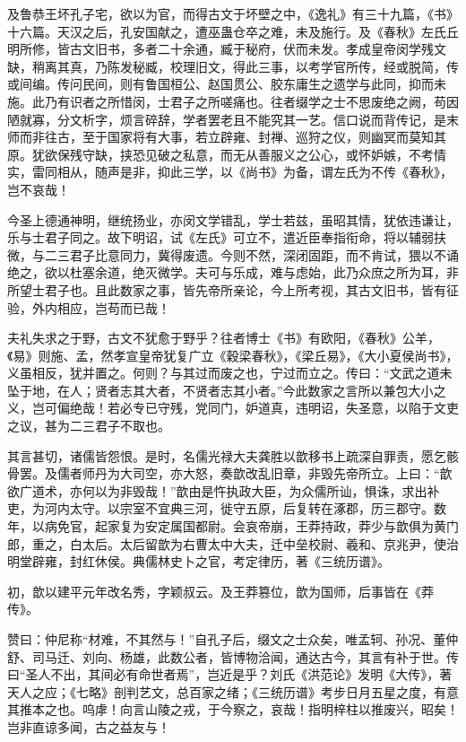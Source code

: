 \documentclass[12pt,UTF8]{ctexbook}
\begin{document}
及鲁恭王坏孔子宅，欲以为官，而得古文于坏壁之中，《逸礼》有三十九篇，《书》十六篇。天汉之后，孔安国献之，遭巫蛊仓卒之难，未及施行。及《春秋》左氏丘明所修，皆古文旧书，多者二十余通，臧于秘府，伏而未发。孝成皇帝闵学残文缺，稍离其真，乃陈发秘臧，校理旧文，得此三事，以考学官所传，经或脱简，传或间编。传问民间，则有鲁国桓公、赵国贯公、胶东庸生之遗学与此同，抑而未施。此乃有识者之所惜闵，士君子之所嗟痛也。往者缀学之士不思废绝之阙，苟因陋就寡，分文析字，烦言碎辞，学者罢老且不能究其一艺。信口说而背传记，是末师而非往古，至于国家将有大事，若立辟雍、封禅、巡狩之仪，则幽冥而莫知其原。犹欲保残守缺，挟恐见破之私意，而无从善服义之公心，或怀妒嫉，不考情实，雷同相从，随声是非，抑此三学，以《尚书》为备，谓左氏为不传《春秋》，岂不哀哉！



今圣上德通神明，继统扬业，亦闵文学错乱，学士若兹，虽昭其情，犹依违谦让，乐与士君子同之。故下明诏，试《左氏》可立不，遣近臣奉指衔命，将以辅弱扶微，与二三君子比意同力，冀得废遗。今则不然，深闭固距，而不肯试，猥以不诵绝之，欲以杜塞余道，绝灭微学。夫可与乐成，难与虑始，此乃众庶之所为耳，非所望士君子也。且此数家之事，皆先帝所亲论，今上所考视，其古文旧书，皆有征验，外内相应，岂苟而已哉！



夫礼失求之于野，古文不犹愈于野乎？往者博士《书》有欧阳，《春秋》公羊，《易》则施、孟，然孝宣皇帝犹复广立《穀梁春秋》，《梁丘易》，《大小夏侯尚书》，义虽相反，犹并置之。何则？与其过而废之也，宁过而立之。传曰：“文武之道未坠于地，在人；贤者志其大者，不贤者志其小者。”今此数家之言所以兼包大小之义，岂可偏绝哉！若必专已守残，党同门，妒道真，违明诏，失圣意，以陷于文吏之议，甚为二三君子不取也。



其言甚切，诸儒皆怨恨。是时，名儒光禄大夫龚胜以歆移书上疏深自罪责，愿乞骸骨罢。及儒者师丹为大司空，亦大怒，奏歆改乱旧章，非毁先帝所立。上曰：“歆欲广道术，亦何以为非毁哉！”歆由是忤执政大臣，为众儒所讪，惧诛，求出补吏，为河内太守。以宗室不宜典三河，徙守五原，后复转在涿郡，历三郡守。数年，以病免官，起家复为安定属国都尉。会哀帝崩，王莽持政，莽少与歆俱为黄门郎，重之，白太后。太后留歆为右曹太中大夫，迁中垒校尉、羲和、京兆尹，使治明堂辟雍，封红休侯。典儒林史卜之官，考定律历，著《三统历谱》。



初，歆以建平元年改名秀，字颖叔云。及王莽篡位，歆为国师，后事皆在《莽传》。



赞曰：仲尼称“材难，不其然与！”自孔子后，缀文之士众矣，唯孟轲、孙况、董仲舒、司马迁、刘向、杨雄，此数公者，皆博物洽闻，通达古今，其言有补于世。传曰“圣人不出，其间必有命世者焉”，岂近是乎？刘氏《洪范论》发明《大传》，著天人之应；《七略》剖判艺文，总百家之绪；《三统历谱》考步日月五星之度，有意其推本之也。呜虖！向言山陵之戎，于今察之，哀哉！指明梓柱以推废兴，昭矣！岂非直谅多闻，古之益友与！
\end{document}
